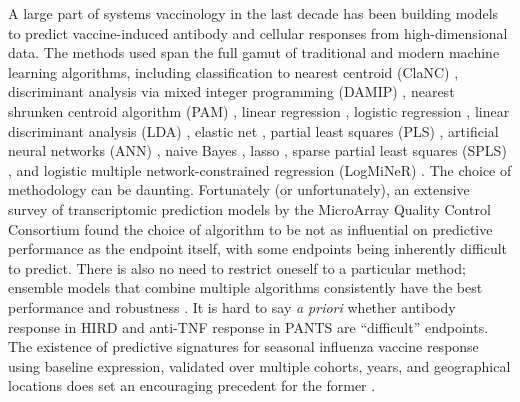 A large part of systems vaccinology in the last decade has been building models to predict vaccine-induced antibody and cellular responses from high-dimensional data.
The methods used span the full gamut of traditional and modern machine learning algorithms, including
classification to nearest centroid (ClaNC) \autocite{querec2009SystemsBiologyApproach},
discriminant analysis via mixed integer programming (DAMIP) \autocite{querec2009SystemsBiologyApproach,nakaya2011SystemsBiologyVaccination,nakaya2015SystemsAnalysisImmunity,kazmin2017SystemsAnalysisProtective},
nearest shrunken centroid algorithm (PAM) \autocite{vahey2010ExpressionGenesAssociated},
linear regression \autocite{bucasas2011EarlyPatternsGene,li2017MetabolicPhenotypesResponse},
logistic regression \autocite{haynes2012ImmuneCorrelatesAnalysisHIV1,furman2014SystemsAnalysisSex,tan2014GeneSignaturesRelated},
linear discriminant analysis (LDA) \autocite{zak2012MerckAd5HIV,tsang2014GlobalAnalysesHuman},
elastic net \autocite{furman2013ApoptosisOtherImmune},
partial least squares (PLS) \autocite{tsang2014GlobalAnalysesHuman},
artificial neural networks (ANN) \autocite{nakaya2015SystemsAnalysisImmunity},
naive Bayes \autocite{fourati2016PrevaccinationInflammationBcell},
lasso \autocite{qi2016DefectiveMemoryCell},
sparse partial least squares (SPLS) \autocite{rechtien2017SystemsVaccinologyIdentifies},
and logistic multiple network-constrained regression (LogMiNeR)
\autocite{avey2017MultipleNetworkconstrainedRegressions,avey2020SeasonalVariabilityShared}.
The choice of methodology can be daunting.
Fortunately (or unfortunately), 
an extensive survey of transcriptomic prediction models by the MicroArray Quality Control Consortium \autocite{maqcconsortium2010MicroArrayQualityControl}
found the choice of algorithm to be not as influential on predictive performance as 
the endpoint itself, with some endpoints being inherently difficult to predict.
There is also no need to restrict oneself to a particular method;
ensemble models that combine multiple algorithms consistently have the best performance and robustness \autocite{camacho2018NextGenerationMachineLearning}.
It is hard to say \textit{a priori} whether antibody response in \gls{HIRD} and anti-\gls{TNF} response in \gls{PANTS} are \enquote{difficult} endpoints.
The existence of predictive signatures for seasonal influenza vaccine response using baseline expression, 
validated over multiple cohorts, years, and geographical locations does set an encouraging precedent for the former \autocite{hipc-chisignaturesprojectteam2017MulticohortAnalysisReveals}.
%

